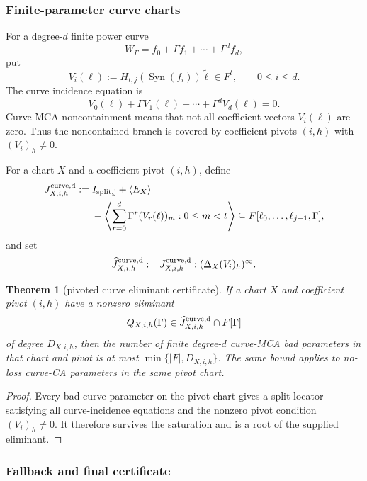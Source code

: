 \documentclass[11pt]{article}
\newtheorem{theorem}{Theorem}[section]
\theoremstyle{definition}
\theoremstyle{remark}
\newcommand{\Syn}{\operatorname{Syn}}
\begin{document}
\subsubsection{Finite-parameter curve charts}

For a degree-$d$ finite power curve
\[
        W_\Gamma=f_0+\Gamma f_1+\cdots+\Gamma^d f_d,
\]
put
\[
        V_i(\ell):=H_{t,j}(\Syn(f_i))\widetilde\ell\in F^t,
        \qquad 0\le i\le d .
\]
The curve incidence equation is
\[
        V_0(\ell)+\Gamma V_1(\ell)+\cdots+\Gamma^d V_d(\ell)=0 .
\]
Curve-MCA noncontainment means that not all coefficient vectors $V_i(\ell)$ are
zero.  Thus the noncontained branch is covered by coefficient pivots
$(i,h)$ with $(V_i)_h\ne0$.

For a chart $X$ and a coefficient pivot $(i,h)$, define
\[
\begin{aligned}
        J^{\rm curve,d}_{X,i,h}:={}&
        I_{\rm split,j}+\langle E_X\rangle \\
        &+\left\langle
          \sum_{r=0}^d \Gamma^r (V_r(\ell))_m:
          0\le m<t
          \right\rangle
        \subseteq F[\ell_0,\ldots,\ell_{j-1},\Gamma],
\end{aligned}
\]
and set
\[
        \widehat J^{\rm curve,d}_{X,i,h}
        :=J^{\rm curve,d}_{X,i,h}:(\Delta_X (V_i)_h)^\infty .
\]

\begin{theorem}[pivoted curve eliminant certificate]
\label{thm:aperiodic-curve-eliminant}
If a chart $X$ and coefficient pivot $(i,h)$ have a nonzero eliminant
\[
        Q_{X,i,h}(\Gamma)\in
        \widehat J^{\rm curve,d}_{X,i,h}\cap F[\Gamma]
\]
of degree $D_{X,i,h}$, then the number of finite degree-$d$ curve-MCA bad
parameters in that chart and pivot is at most $\min\{|F|,D_{X,i,h}\}$.  The same
bound applies to no-loss curve-CA parameters in the same pivot chart.
\end{theorem}

\begin{proof}
Every bad curve parameter on the pivot chart gives a split locator satisfying all
curve-incidence equations and the nonzero pivot condition $(V_i)_h\ne0$.  It
therefore survives the saturation and is a root of the supplied eliminant.
\end{proof}

\subsubsection{Fallback and final certificate}
\end{document}
